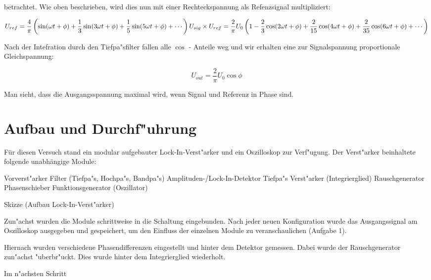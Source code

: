 \documentclass{scrartcl}
\begin{document}
betrachtet. Wie oben beschrieben, wird dies nun mit einer Rechteckspannung als Refenzsignal multipliziert:

\begin{displaymath}
	U_{ref} = \frac{4}{\pi} 
		\left(\sin(\omega t + \phi) + 
			\frac{1}{3} \sin(3 \omega t + \phi) + 
			\frac{1}{5} \sin(5 \omega t + \phi) + 
			\cdots 
		\right) \\

	U_{sig} \times U_{ref} = \frac{2}{\pi} U_0 
	\left(
		1 - 
		\frac{2}{3}\cos(2 \omega t + \phi) + 
		\frac{2}{15} \cos(4 \omega t + \phi) + 
		\frac{2}{35} \cos(6 \omega t + \phi) + 
		\cdots 
	\right)
\end{displaymath}

Nach der Intefration durch den Tiefpa"sfilter fallen alle $\cos$ - Anteile weg und wir erhalten eine zur Signalspannung proportionale Gleichspannung:

\begin{equation}
	U_{out} = \frac{2}{\pi} U_0 \cos{\phi}
\end{equation}

Man sieht, dass die Ausgangsspannung maximal wird, wenn Signal und Referenz in Phase sind.

\section{Aufbau und Durchf"uhrung}

Für diesen Versuch stand ein modular aufgebauter Lock-In-Verst"arker und ein Oszilloskop zur Verf"ugung.
Der Verst"arker beinhaltete folgende unabhängige Module:

Vorverst"arker
Filter (Tiefpa"s, Hochpa"s, Bandpa"s)
Amplituden-/Lock-In-Detektor
Tiefpa"s Verst"arker (Integrierglied)
Rauschgenerator
Phasenschieber
Funktionsgenerator (Oszillator)

Skizze (Aufbau Lock-In-Verst"arker)


Zun"achst wurden die Module schrittweise in die Schaltung eingebunden.
Nach jeder neuen Konfiguration wurde das Ausgangssignal am Oszilloskop ausgegeben und gespeichert,
um den Einfluss der einzelnen Module zu veranschaulichen (Aufgabe 1).

Hiernach wurden verschiedene Phasendifferenzen eingestellt und hinter dem Detektor gemessen.
Dabei wurde der Rauschgenerator zun"achst "uberbr"uckt.
Dies wurde hinter dem Integrierglied wiederholt.

Im n"achsten Schritt 
\end{document}
